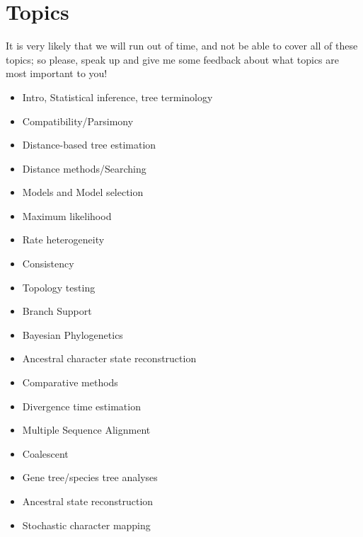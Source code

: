 \documentclass{article}
\begin{document}
\section*{Topics}
It is very likely that we will run out of time, and not be able to cover all of these topics; so
please, speak up and give me some feedback about what topics are most important to you!\\
\begin{itemize}
 \item Intro, Statistical inference, tree terminology
 \item Compatibility/Parsimony
 \item Distance-based tree estimation
 \item Distance methods/Searching
 \item Models and Model selection
 \item Maximum likelihood
 \item Rate heterogeneity
 \item Consistency
 \item Topology testing
 \item Branch Support
 \item Bayesian Phylogenetics
 \item Ancestral character state reconstruction
 \item Comparative methods
 \item Divergence time estimation
 \item Multiple Sequence Alignment
 \item Coalescent
 \item Gene tree/species tree analyses
 \item Ancestral state reconstruction
 \item Stochastic character mapping
\end{itemize}
\end{document}
